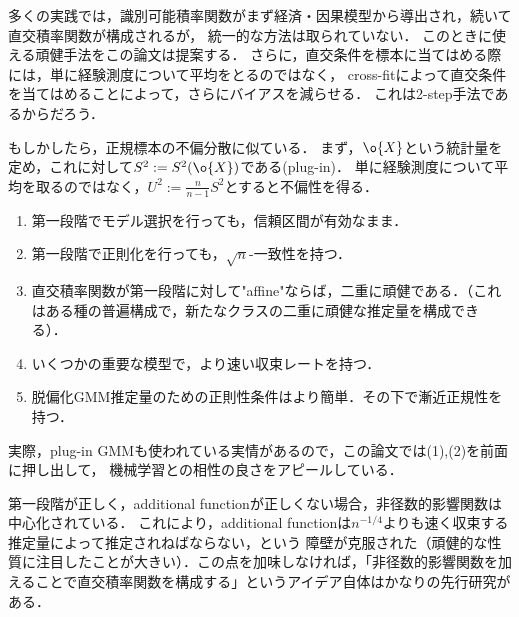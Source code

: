 \documentclass[uplatex,dvipdfmx]{jsreport}
\begin{document}
\begin{synopsis}
    多くの実践では，識別可能積率関数がまず経済・因果模型から導出され，続いて直交積率関数が構成されるが，
    統一的な方法は取られていない．
    このときに使える頑健手法をこの論文は提案する．
    さらに，直交条件を標本に当てはめる際には，単に経験測度について平均をとるのではなく，
    cross-fitによって直交条件を当てはめることによって，さらにバイアスを減らせる．
    これは2-step手法であるからだろう．
\end{synopsis}

\begin{remark}[古典理論とのアナロジー]
    もしかしたら，正規標本の不偏分散に似ている．
    まず，$\o{X}$という統計量を定め，これに対して$S^2:=S^2(\o{X})$である(plug-in)．
    単に経験測度について平均を取るのではなく，$U^2:=\frac{n}{n-1}S^2$とすると不偏性を得る．
\end{remark}

\begin{synopsis}[合成ではなく脱偏化を採用すると]\mbox{}
    \begin{enumerate}
        \item 第一段階でモデル選択を行っても，信頼区間が有効なまま．
        \item 第一段階で正則化を行っても，$\sqrt{n}$-一致性を持つ．
        \item 直交積率関数が第一段階に対して"affine"ならば，二重に頑健である．（これはある種の普遍構成で，新たなクラスの二重に頑健な推定量を構成できる）．
        \item いくつかの重要な模型で，より速い収束レートを持つ．
        \item 脱偏化GMM推定量のための正則性条件はより簡単．その下で漸近正規性を持つ．
    \end{enumerate}
    実際，plug-in GMMも使われている実情があるので，この論文では(1),(2)を前面に押し出して，
    機械学習との相性の良さをアピールしている．
\end{synopsis}

\begin{synopsis}[非径数的影響関数の頑健な性質]
    第一段階が正しく，additional functionが正しくない場合，非径数的影響関数は中心化されている．
    これにより，additional functionは$n^{-1/4}$よりも速く収束する推定量によって推定されねばならない，という
    障壁が克服された（頑健的な性質に注目したことが大きい）．この点を加味しなければ，「非径数的影響関数を加えることで直交積率関数を構成する」というアイデア自体はかなりの先行研究がある．

\end{synopsis}
\end{document}
